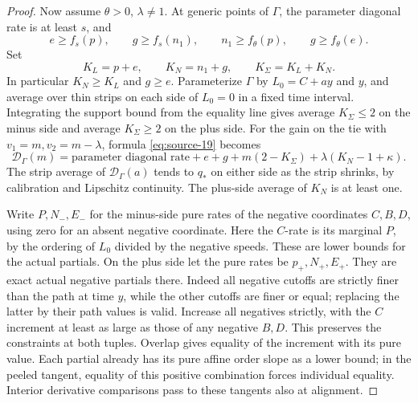 \begin{proof}
Now assume \(\theta>0\), \(\lambda\ne1\). At generic points of
\(\Gamma\), the parameter diagonal rate is at least \(s\), and
\begin{equation}\label{eq:source-22}
e\ge f_s(p),\qquad g\ge f_s(n_1),\qquad
n_1\ge f_\theta(p),\qquad g\ge f_\theta(e).
\end{equation}
Set
\[
K_L=p+e,\qquad K_N=n_1+g,\qquad K_\Sigma=K_L+K_N.
\]
In particular \(K_N\ge K_L\) and \(g\ge e\). Parameterize \(\Gamma\)
by \(L_0=C+ay\) and \(y\), and average over thin strips on each side
of \(L_0=0\) in a fixed time interval. Integrating the support bound
from the equality line gives average \(K_\Sigma\le2\) on the minus
side and average \(K_\Sigma\ge2\) on the plus side. For the gain
on the tie with \(v_1=m,v_2=m-\lambda\), formula
\eqref{eq:source-19} becomes
\begin{equation}\label{eq:source-23}
\mathcal D_\Gamma(m)
=\text{parameter diagonal rate}+e+g+m(2-K_\Sigma)
 +\lambda(K_N-1+\kappa).
\end{equation}
The strip average of \(\mathcal D_\Gamma(a)\) tends to \(q_*\) on
either side as the strip shrinks, by calibration and Lipschitz continuity.
The plus-side average of \(K_N\) is at least one.

Write \(P,N_-,E_-\) for the minus-side pure rates of the negative
coordinates \(C,B,D\), using zero for an absent negative coordinate.
Here the \(C\)-rate is its marginal \(P\), by the ordering of
\(L_0\) divided by the negative speeds. These are lower bounds for the
actual partials. On the plus side let the pure rates be \(p_+,N_+,E_+\).
They are exact actual negative partials there. Indeed all negative
cutoffs are strictly finer than the path at time \(y\), while the
other cutoffs are finer or equal; replacing the latter by their path
values is valid. Increase all negatives strictly, with the \(C\)
increment at least as large as those of any negative \(B,D\).
This preserves the constraints at both tuples. Overlap gives equality
of the increment with its pure value. Each partial already has its
pure affine order slope as a lower bound; in the peeled tangent,
equality of this positive combination forces individual equality.
Interior derivative comparisons pass to these tangents also at alignment.


\end{proof}
